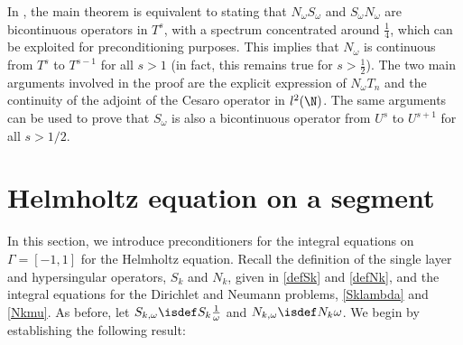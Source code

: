 \documentclass[a4paper]{article}
\begin{document}
	\begin{Rem}
		In \cite{bruno2012second}, the main theorem is equivalent to stating that $N_\omega S_\omega$ and $S_\omega N_\omega$ are bicontinuous operators in $T^s$, with a spectrum concentrated around $\frac{1}{4}$, which can be exploited for preconditioning purposes. This implies that $N_\omega$ is continuous from $T^s$ to $T^{s-1}$ for all $s >1$ (in fact, this remains true for $s > \frac{1}{2}$). The two main arguments involved in the proof are the explicit expression of $N_\omega T_n$ and the continuity of the adjoint of the Cesaro operator in $l^2(\N)$. The same arguments can be used to prove that $S_\omega$ is also a bicontinuous operator from $U^s$ to $U^{s+1}$ for all $s > 1/2$. 
	\end{Rem}
	
	
	
	\section{Helmholtz equation on a segment}
	
	In this section, we introduce preconditioners for the integral equations on $\Gamma = [-1,1]$ for the Helmholtz equation. Recall the definition of the single layer and hypersingular operators, $S_k$ and $N_k$, given in \eqref{defSk} and \eqref{defNk}, and the integral equations for the Dirichlet and Neumann problems, \eqref{Sklambda} and \eqref{Nkmu}. As before, let $S_{k,\omega} \isdef S_k \frac{1}{\omega}$ and $N_{k,\omega} \isdef N_k \omega$. We begin by establishing the following result:
	
\end{document}
